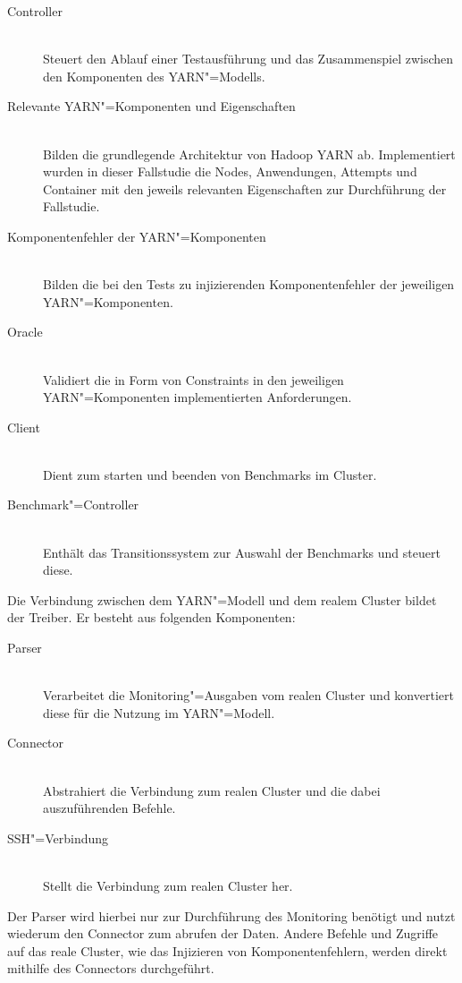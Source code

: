 \begin{description}
    \item [Controller] \hfill \\
        Steuert den Ablauf einer Testausführung und das Zusammenspiel zwischen den Komponenten des YARN"=Modells.
    \item [Relevante YARN"=Komponenten und Eigenschaften] \hfill \\
        Bilden die grundlegende Architektur von Hadoop YARN ab.
        Implementiert wurden in dieser Fallstudie die Nodes, Anwendungen, Attempts und Container mit den jeweils relevanten Eigenschaften zur Durchführung der Fallstudie.
    \item [Komponentenfehler der YARN"=Komponenten] \hfill \\
        Bilden die bei den Tests zu injizierenden Komponentenfehler der jeweiligen YARN"=Komponenten.
    \item [Oracle] \hfill \\
        Validiert die in Form von Constraints in den jeweiligen YARN"=Komponenten implementierten Anforderungen.
    \item [Client] \hfill \\
        Dient zum starten und beenden von Benchmarks im Cluster.
    \item [Benchmark"=Controller] \hfill \\
        Enthält das Transitionssystem zur Auswahl der Benchmarks und steuert diese.
\end{description}

Die Verbindung zwischen dem YARN"=Modell und dem realem Cluster bildet der Treiber.
Er besteht aus folgenden Komponenten:

\begin{description}
    \item [Parser] \hfill \\
        Verarbeitet die Monitoring"=Ausgaben vom realen Cluster und konvertiert diese für die Nutzung im YARN"=Modell.
    \item [Connector] \hfill \\
        Abstrahiert die Verbindung zum realen Cluster und die dabei auszuführenden Befehle.
    \item [SSH"=Verbindung]  \hfill \\
        Stellt die Verbindung zum realen Cluster her.
\end{description}

Der Parser wird hierbei nur zur Durchführung des Monitoring benötigt und nutzt wiederum den Connector zum abrufen der Daten.
Andere Befehle und Zugriffe auf das reale Cluster, wie \zB das Injizieren von Komponentenfehlern, werden direkt mithilfe des Connectors durchgeführt.

